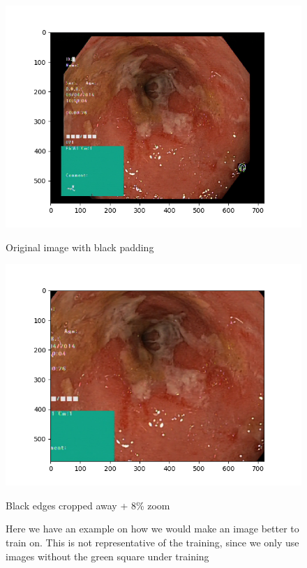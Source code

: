     \begin{figure}[ht]
      \centering
      \begin{minipage}[b]{0.45\textwidth}
	\includegraphics[width=\textwidth]{background/figures/uncropped_img.png}
	\caption{Original image with black padding}
      \end{minipage}
      \hfill
      \begin{minipage}[b]{0.45\textwidth}
	\includegraphics[width=\textwidth]{background/figures/cropped_8percent_img.png}
	\caption{Black edges cropped away + 8\% zoom}
      \end{minipage}
      \caption{Here we have an example on how we would make an image better to train on. This is not representative of the training, since we only use images without the green square under training}
    \end{figure}
    
